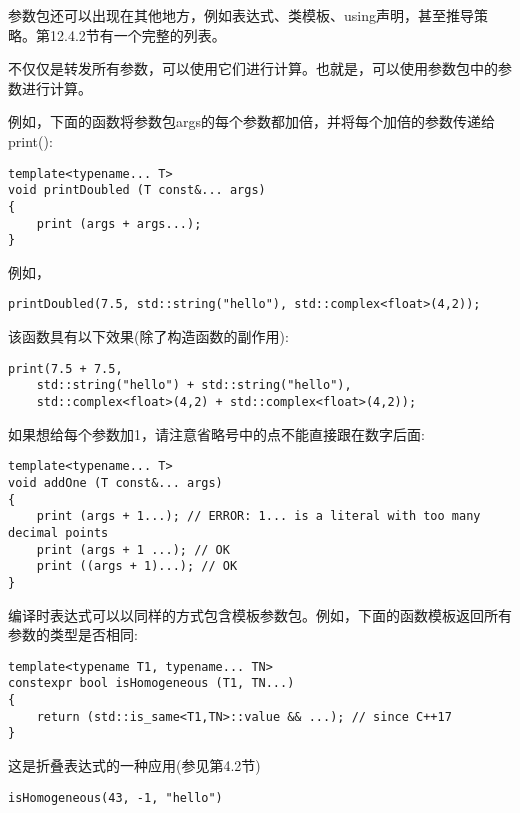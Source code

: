 
参数包还可以出现在其他地方，例如表达式、类模板、using声明，甚至推导策略。第12.4.2节有一个完整的列表。


不仅仅是转发所有参数，可以使用它们进行计算。也就是，可以使用参数包中的参数进行计算。

例如，下面的函数将参数包args的每个参数都加倍，并将每个加倍的参数传递给print():

\begin{lstlisting}[style=styleCXX]
template<typename... T>
void printDoubled (T const&... args)
{
	print (args + args...);
}
\end{lstlisting}

例如，

\begin{lstlisting}[style=styleCXX]
printDoubled(7.5, std::string("hello"), std::complex<float>(4,2));
\end{lstlisting}

该函数具有以下效果(除了构造函数的副作用):

\begin{lstlisting}[style=styleCXX]
print(7.5 + 7.5,
	std::string("hello") + std::string("hello"),
	std::complex<float>(4,2) + std::complex<float>(4,2));
\end{lstlisting}

如果想给每个参数加1，请注意省略号中的点不能直接跟在数字后面:

\begin{lstlisting}[style=styleCXX]
template<typename... T>
void addOne (T const&... args)
{
	print (args + 1...); // ERROR: 1... is a literal with too many decimal points
	print (args + 1 ...); // OK
	print ((args + 1)...); // OK
}
\end{lstlisting}

编译时表达式可以以同样的方式包含模板参数包。例如，下面的函数模板返回所有参数的类型是否相同:

\begin{lstlisting}[style=styleCXX]
template<typename T1, typename... TN>
constexpr bool isHomogeneous (T1, TN...)
{
	return (std::is_same<T1,TN>::value && ...); // since C++17
}
\end{lstlisting}

这是折叠表达式的一种应用(参见第4.2节)

\begin{lstlisting}[style=styleCXX]
isHomogeneous(43, -1, "hello")
\end{lstlisting}

